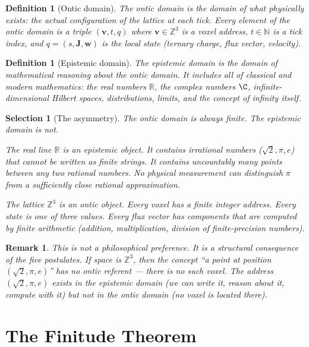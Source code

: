 \documentclass[11pt]{article}
\theoremstyle{tight}
\theoremstyle{plainroman}
\newtheorem{selection}[theorem]{Selection}
\newtheorem{remark}[theorem]{Remark}
\newtheorem{definition}[theorem]{Definition}
\newcommand{\R}{\mathbb{R}}
\newcommand{\Z}{\mathbb{Z}}
\newcommand{\N}{\mathbb{N}}
\begin{document}
\begin{definition}[Ontic domain]
The \emph{ontic domain} is the domain of what physically exists: the actual configuration of the lattice at each tick.
Every element of the ontic domain is a triple $(\mathbf v, t, q)$ where $\mathbf v\in\Z^3$ is a voxel address, $t\in\N$ is a tick index, and $q=(s,\mathbf J,\mathbf w)$ is the local state (ternary charge, flux vector, velocity).
\end{definition}

\begin{definition}[Epistemic domain]
The \emph{epistemic domain} is the domain of mathematical reasoning about the ontic domain.
It includes all of classical and modern mathematics: the real numbers $\R$, the complex numbers $\C$, infinite-dimensional Hilbert spaces, distributions, limits, and the concept of infinity itself.
\end{definition}

\begin{selection}[The asymmetry]
The ontic domain is always finite.
The epistemic domain is not.

The real line $\R$ is an epistemic object.
It contains irrational numbers ($\sqrt{2},\pi,e$) that cannot be written as finite strings.
It contains uncountably many points between any two rational numbers.
No physical measurement can distinguish $\pi$ from a sufficiently close rational approximation.

The lattice $\Z^3$ is an ontic object.
Every voxel has a finite integer address.
Every state is one of three values.
Every flux vector has components that are computed by finite arithmetic (addition, multiplication, division of finite-precision numbers).
\end{selection}

\begin{remark}
This is not a philosophical preference.
It is a structural consequence of the five postulates.
If space is $\Z^3$, then the concept ``a point at position $(\sqrt{2},\pi,e)$'' has no ontic referent --- there is no such voxel.
The address $(\sqrt{2},\pi,e)$ exists in the epistemic domain (we can write it, reason about it, compute with it) but not in the ontic domain (no voxel is located there).
\end{remark}

\section{The Finitude Theorem}
\end{document}
